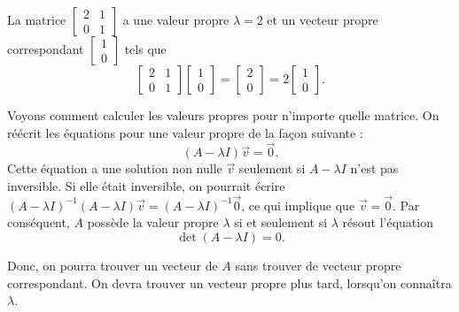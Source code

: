 \begin{example}
La matrice $\left[ \begin{smallmatrix}
					2 & 1 \\
					0 & 1
					\end{smallmatrix} \right]$ 
a une valeur propre $\lambda = 2$ et un vecteur propre correspondant 
$\left[ \begin{smallmatrix}
	1 \\ 0
\end{smallmatrix} \right]$ 
tels que
\begin{equation*}
\begin{bmatrix}
2 & 1 \\
0 & 1
\end{bmatrix}
\begin{bmatrix}
1 \\ 0
\end{bmatrix}
=
\begin{bmatrix}
2 \\
0 
\end{bmatrix}
=
2
\begin{bmatrix}
1 \\ 0
\end{bmatrix} .
\end{equation*}
\end{example}

Voyons comment calculer les valeurs propres pour n'importe quelle matrice. On réécrit les équations pour une valeur propre de la façon suivante :
\begin{equation*}
(A - \lambda I)\vec{v} = \vec{0} .
\end{equation*}
Cette équation a une solution non nulle $\vec{v}$ seulement si 
$A - \lambda I$ n'est pas inversible. Si elle était inversible, on pourrait écrire
${(A - \lambda I)}^{-1}(A - \lambda I)\vec{v} = {(A-\lambda I)}^{-1}\vec{0}$,
ce qui implique que $\vec{v} = \vec{0}$. Par conséquent,
$A$ possède la valeur propre $\lambda$ si et seulement si $\lambda$ résout l'équation
\begin{equation*}
\det (A-\lambda I) = 0 .
\end{equation*}

Donc, on pourra trouver un vecteur de $A$ sans trouver de vecteur propre correspondant. On devra trouver un vecteur propre plus tard, lorsqu'on connaîtra $\lambda$.

